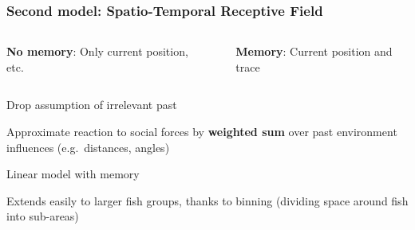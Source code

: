 \documentclass{beamer}
\begin{document}
\begin{frame}
  \frametitle{Second model: Spatio-Temporal Receptive Field}
 \begin{columns}
   \begin{column}{0.5\textwidth}

 \textbf{No memory}: Only current position, etc.
\end{column}~\begin{column}{0.5\textwidth}

 \textbf{Memory}: Current position and trace
   \end{column}
 \end{columns}
  Drop assumption of irrelevant past

  Approximate reaction to social forces by \textbf{weighted sum} over past environment influences (e.g.\ distances, angles)

  Linear model with memory

  Extends easily to larger fish groups, thanks to binning
  (dividing space around fish into sub-areas)
\end{frame}
\end{document}
